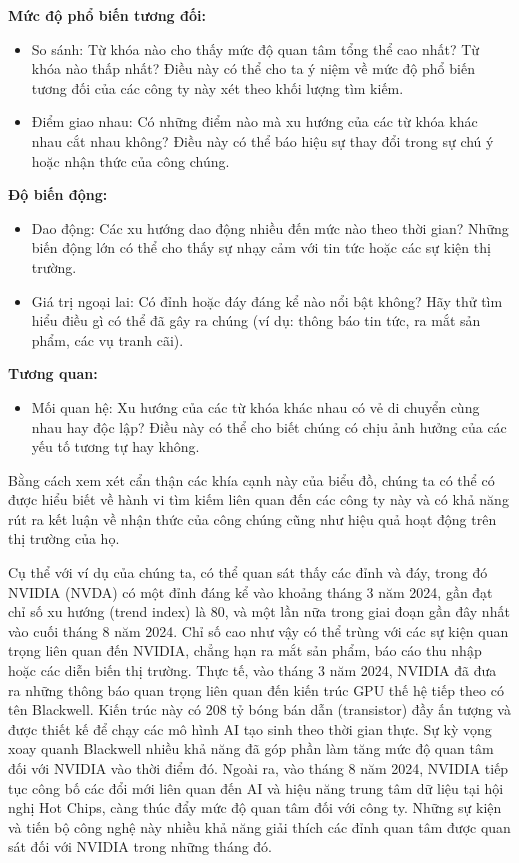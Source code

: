 \textbf{Mức độ phổ biến tương đối:}
\begin{itemize}
  \item So sánh: Từ khóa nào cho thấy mức độ quan tâm tổng thể cao nhất? Từ khóa nào thấp nhất? Điều này có thể cho ta ý niệm về mức độ phổ biến tương đối của các công ty này xét theo khối lượng tìm kiếm.
  \item Điểm giao nhau: Có những điểm nào mà xu hướng của các từ khóa khác nhau cắt nhau không? Điều này có thể báo hiệu sự thay đổi trong sự chú ý hoặc nhận thức của công chúng.
\end{itemize}

\textbf{Độ biến động:}
\begin{itemize}
  \item Dao động: Các xu hướng dao động nhiều đến mức nào theo thời gian? Những biến động lớn có thể cho thấy sự nhạy cảm với tin tức hoặc các sự kiện thị trường.
  \item Giá trị ngoại lai: Có đỉnh hoặc đáy đáng kể nào nổi bật không? Hãy thử tìm hiểu điều gì có thể đã gây ra chúng (ví dụ: thông báo tin tức, ra mắt sản phẩm, các vụ tranh cãi).
\end{itemize}

\textbf{Tương quan:}
\begin{itemize}
  \item Mối quan hệ: Xu hướng của các từ khóa khác nhau có vẻ di chuyển cùng nhau hay độc lập? Điều này có thể cho biết chúng có chịu ảnh hưởng của các yếu tố tương tự hay không.
\end{itemize}

Bằng cách xem xét cẩn thận các khía cạnh này của biểu đồ, chúng ta có thể có được hiểu biết về hành vi tìm kiếm liên quan đến các công ty này và có khả năng rút ra kết luận về nhận thức của công chúng cũng như hiệu quả hoạt động trên thị trường của họ.

Cụ thể với ví dụ của chúng ta, có thể quan sát thấy các đỉnh và đáy, trong đó NVIDIA (NVDA) có một đỉnh đáng kể vào khoảng tháng 3 năm 2024, gần đạt chỉ số xu hướng (trend index) là 80, và một lần nữa trong giai đoạn gần đây nhất vào cuối tháng 8 năm 2024. Chỉ số cao như vậy có thể trùng với các sự kiện quan trọng liên quan đến NVIDIA, chẳng hạn ra mắt sản phẩm, báo cáo thu nhập hoặc các diễn biến thị trường. Thực tế, vào tháng 3 năm 2024, NVIDIA đã đưa ra những thông báo quan trọng liên quan đến kiến trúc GPU thế hệ tiếp theo có tên Blackwell. Kiến trúc này có 208 tỷ bóng bán dẫn (transistor) đầy ấn tượng và được thiết kế để chạy các mô hình AI tạo sinh theo thời gian thực. Sự kỳ vọng xoay quanh Blackwell nhiều khả năng đã góp phần làm tăng mức độ quan tâm đối với NVIDIA vào thời điểm đó. Ngoài ra, vào tháng 8 năm 2024, NVIDIA tiếp tục công bố các đổi mới liên quan đến AI và hiệu năng trung tâm dữ liệu tại hội nghị Hot Chips, càng thúc đẩy mức độ quan tâm đối với công ty. Những sự kiện và tiến bộ công nghệ này nhiều khả năng giải thích các đỉnh quan tâm được quan sát đối với NVIDIA trong những tháng đó.

